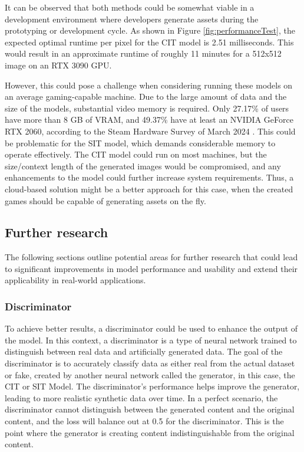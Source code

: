     It can be observed that both methods could be somewhat viable in a development environment where developers generate assets during the prototyping or development cycle. As shown in Figure \autoref{fig:performanceTest}, the expected optimal runtime per pixel for the CIT model is 2.51 milliseconds. This would result in an approximate runtime of roughly 11 minutes for a 512x512 image on an RTX 3090 GPU.
    
    However, this could pose a challenge when considering running these models on an average gaming-capable machine. Due to the large amount of data and the size of the models, substantial video memory is required. Only 27.17\% of users have more than 8 GB of VRAM, and 49.37\% have at least an NVIDIA GeForce RTX 2060, according to the Steam Hardware Survey of March 2024 \autocite{Valve2024}. This could be problematic for the SIT model, which demands considerable memory to operate effectively. The CIT model could run on most machines, but the size/context length of the generated images would be compromised, and any enhancements to the model could further increase system requirements. Thus, a cloud-based solution might be a better approach for this case, when the created games should be capable of generating assets on the fly.
    

\subsection{Further research}

    The following sections outline potential areas for further research that could lead to significant improvements in model performance and usability and extend their applicability in real-world applications.

    \subsubsection{Discriminator}
    To achieve better results, a discriminator could be used to enhance the output of the model. In this context, a discriminator is a type of neural network trained to distinguish between real data and artificially generated data. The goal of the discriminator is to accurately classify data as either real from the actual dataset or fake, created by another neural network called the generator, in this case, the CIT or SIT Model. The discriminator's performance helps improve the generator, leading to more realistic synthetic data over time. In a perfect scenario, the discriminator cannot distinguish between the generated content and the original content, and the loss will balance out at 0.5 for the discriminator. This is the point where the generator is creating content indistinguishable from the original content.

